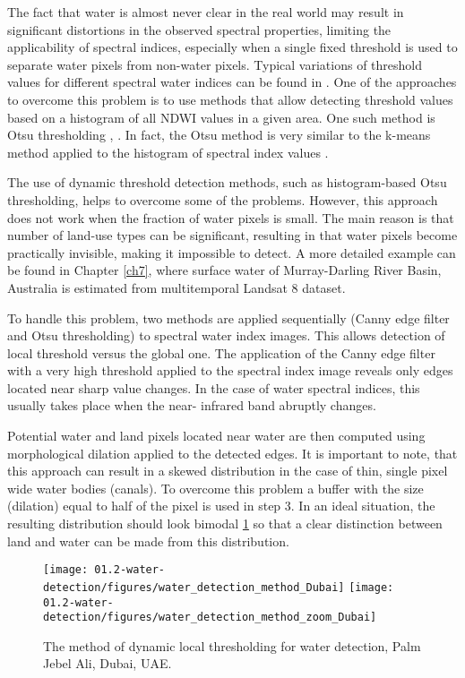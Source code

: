 The fact that water is almost never clear in the real world may result in significant distortions in the observed spectral properties, limiting the applicability of spectral indices, especially when a single fixed threshold is used to separate water pixels from non-water pixels. Typical variations of threshold values for different spectral water indices can be found in \citet{Ji2009}. One of the approaches to overcome this problem is to use methods that allow detecting threshold values based on a histogram of all NDWI values in a given area. One such method is Otsu thresholding \citet{Li2013}, \citet{Yang2014}. In fact, the Otsu method is very similar to the k-means method applied to the histogram of spectral index values \citet{Liu2009}.

The use of dynamic threshold detection methods, such as histogram-based Otsu thresholding, helps to overcome some of the problems. However, this approach does not work when the fraction of water pixels is small. The main reason is that number of land-use types can be significant, resulting in that water pixels become practically invisible, making it impossible to detect. A more detailed example can be found in Chapter \ref{ch7}, where surface water of Murray-Darling River Basin, Australia is estimated from multitemporal Landsat 8 dataset.

To handle this problem, two methods are applied sequentially (Canny edge filter and Otsu thresholding) to spectral water index images. This allows detection of local threshold versus the global one. The application of the Canny edge filter with a very high threshold applied to the spectral index image reveals only edges located near sharp value changes. In the case of water spectral indices, this usually takes place when the near- infrared band abruptly changes.

Potential water and land pixels located near water are then computed using morphological dilation applied to the detected edges. It is important to note, that this approach can result in a skewed distribution in the case of thin, single pixel wide water bodies (canals). To overcome this problem a buffer with the size (dilation) equal to half of the pixel is used in step 3. In an ideal situation, the resulting distribution should look bimodal \ref{fig:water_detection_method} so that a clear distinction between land and water can be made from this distribution.

\begin{figure}
	\centering
	\texttt{[image: 01.2-water-detection/figures/water\_detection\_method\_Dubai]}
	\texttt{[image: 01.2-water-detection/figures/water\_detection\_method\_zoom\_Dubai]}
	\caption{The method of dynamic local thresholding for water detection, Palm Jebel Ali, Dubai, UAE. }
	\label{fig:water_detection_method}
\end{figure}

